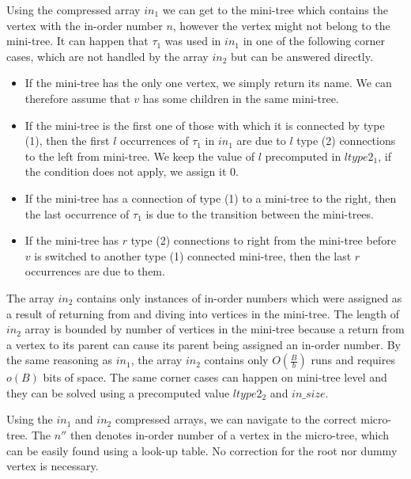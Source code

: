 Using the compressed array $in_1$ we can get to the mini-tree which contains the vertex with the in-order number $n$, however the vertex might not belong to the mini-tree.
It can happen that $\tau_1$ was used in $in_1$ in one of the following corner cases, which are not handled by the array $in_2$ but can be answered directly.
\begin{itemize}
	\item If the mini-tree has the only one vertex, we simply return its name.
	We can therefore assume that $v$ has some children in the same mini-tree.
	\item If the mini-tree is the first one of those with which it is connected by type (1), then the first $l$ occurrences of $\tau_1$ in $in_1$ are due to $l$ type (2) connections to the left from mini-tree.
	We keep the value of $l$ precomputed in $ltype2_1$, if the condition does not apply, we assign it $0$.
	\item If the mini-tree has a connection of type (1) to a mini-tree to the right, then the last occurrence of $\tau_1$ is due to the transition between the mini-trees.
	\item If the mini-tree has $r$ type (2) connections to right from the mini-tree before $v$ is switched to another type (1) connected mini-tree,
	then the last $r$ occurrences are due to them.
\end{itemize}

The array $in_2$ contains only instances of in-order numbers which were assigned as a result of returning from and diving into vertices in the mini-tree.
The length of $in_2$ array is bounded by number of vertices in the mini-tree because a return from a vertex to its parent can cause its parent being assigned an in-order number.
By the same reasoning as $in_1$, the array $in_2$ contains only $O(\frac{B}{b})$ runs and requires $o(B)$ bits of space.
The same corner cases can happen on mini-tree level and they can be solved using a precomputed value $ltype2_2$ and $in\_size$.

Using the $in_1$ and $in_2$ compressed arrays, we can navigate to the correct micro-tree.
The $n''$ then denotes in-order number of a vertex in the micro-tree, which can be easily found using a look-up table.
No correction for the root nor dummy vertex is necessary.

